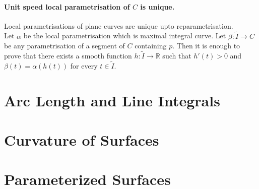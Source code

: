 \paragraph{Unit speed local parametrisation of $C$ is unique.}
Local parametrisations of plane curves are unique upto reparametrisation.\\

	Let $\alpha$ be the local parametrisation which is maximal integral curve. Let $\beta : \tilde{I} \to C$ be any parametrisation of a segment of $C$ containing $p$. Then it is enough to prove that there exists a smooth function $h : \tilde{I} \to \mathbb{R}$ such that $h'(t) > 0$ and $\beta(t) = \alpha(h(t))$ for every $t \in \tilde{I}$.

\section{Arc Length and Line Integrals}

\section{Curvature of Surfaces}

\setcounter{section}{13}
\section{Parameterized Surfaces}

